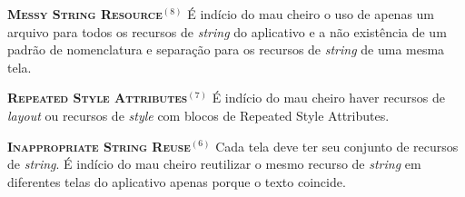   \noindent
  \textbf{\textsc{{\small Messy String Resource}}}$^{(8)}$
      É indício do mau cheiro o uso de apenas um arquivo para todos os recursos de \textit{string} do aplicativo e a não existência de um padrão de nomenclatura e separação para os recursos de \textit{string} de uma mesma tela.


  \noindent
  \textbf{\textsc{{\small Repeated Style Attributes}}}$^{(7)}$
      É indício do mau cheiro haver recursos de \textit{layout} ou recursos de \textit{style} com blocos de Repeated Style Attributes.


  \noindent
  \textbf{\textsc{{\small Inappropriate String Reuse}}}$^{(6)}$
      Cada tela deve ter seu conjunto de recursos de \textit{string}. É indício do mau cheiro reutilizar o mesmo recurso de \textit{string} em diferentes telas do aplicativo apenas porque o texto coincide.


